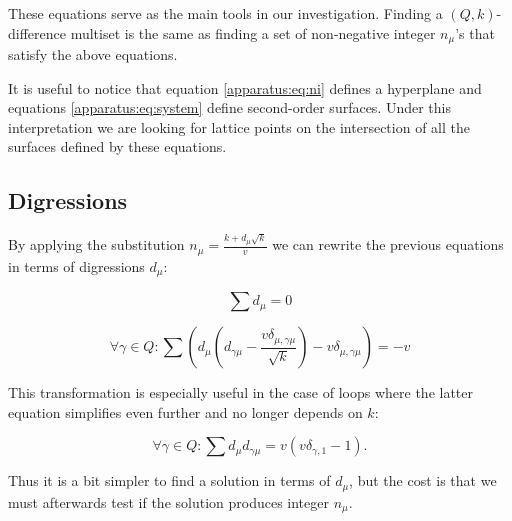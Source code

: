     These equations serve as the main tools in our investigation. Finding a $(Q,k)$-difference multiset is the same as finding a set of non-negative integer $n_\mu$'s that satisfy the above equations. 
    
    It is useful to notice that equation \eqref{apparatus:eq:ni} defines a hyperplane and equations \eqref{apparatus:eq:system} define second-order surfaces. Under this interpretation we are looking for lattice points on the intersection of all the surfaces defined by these equations.

\subsection{Digressions}
\label{sec:digressions}
    By applying the substitution $n_\mu=\frac{k+d_\mu \sqrt k}v$ we can rewrite the previous equations in terms of digressions $d_\mu$:
    
    \begin{equation}
        \label{apparatus:eq:di}
        \sum {d_\mu} = 0
    \end{equation}
    
    \begin{equation}
        \label{apparatus:eq:dsystem_general}
        \forall \gamma \in Q \colon \sum (d_\mu (d_{\gamma\mu}-\frac{v\delta_{\mu,\gamma\mu}}{\sqrt k})-v\delta_{\mu,\gamma\mu}) = -v
    \end{equation}
    
    This transformation is especially useful in the case of loops where the latter equation simplifies even further and no longer depends on $k$:
    
    \begin{equation}
        \label{apparatus:eq:dsystem}
        \forall \gamma \in Q \colon \sum d_\mu d_{\gamma\mu} = v (v \delta_{\gamma,1}-1).
    \end{equation}
    
    Thus it is a bit simpler to find a solution in terms of $d_\mu$, but the cost is that we must afterwards test if the solution produces integer $n_\mu$.
    
